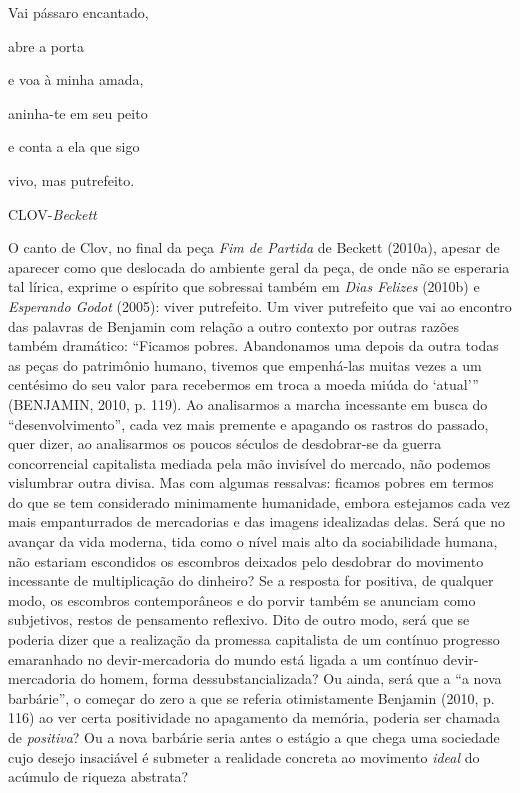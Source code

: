 \begin{flushright}
Vai pássaro encantado,

abre a porta

e voa à minha amada,

aninha-te em seu peito

e conta a ela que sigo

vivo, mas putrefeito.

CLOV-\emph{Beckett}
\end{flushright}

O canto de Clov, no final da peça \emph{Fim de Partida} de Beckett
(2010a), apesar de aparecer como que deslocada do ambiente geral da
peça, de onde não se esperaria tal lírica, exprime o espírito que
sobressai também em \emph{Dias Felizes} (2010b) e \emph{Esperando Godot}
(2005): viver putrefeito. Um viver putrefeito que vai ao encontro das
palavras de Benjamin com relação a outro contexto por outras razões
também dramático: ``Ficamos pobres. Abandonamos uma depois da outra
todas as peças do patrimônio humano, tivemos que empenhá-las muitas
vezes a um centésimo do seu valor para recebermos em troca a moeda miúda
do `atual''' (BENJAMIN, 2010, p. 119). Ao analisarmos a marcha
incessante em busca do ``desenvolvimento'', cada vez mais premente e
apagando os rastros do passado, quer dizer, ao analisarmos os poucos
séculos de desdobrar-se da guerra concorrencial capitalista mediada pela
mão invisível do mercado, não podemos vislumbrar outra divisa. Mas com
algumas ressalvas: ficamos pobres em termos do que se tem considerado
minimamente humanidade, embora estejamos cada vez mais empanturrados de
mercadorias e das imagens idealizadas delas. Será que no avançar da vida
moderna, tida como o nível mais alto da sociabilidade humana, não
estariam escondidos os escombros deixados pelo desdobrar do movimento
incessante de multiplicação do dinheiro? Se a resposta for positiva, de
qualquer modo, os escombros contemporâneos e do porvir também se
anunciam como subjetivos, restos de pensamento reflexivo. Dito de outro
modo, será que se poderia dizer que a realização da promessa capitalista
de um contínuo progresso emaranhado no devir-mercadoria do mundo está
ligada a um contínuo devir-mercadoria do homem, forma
dessubstancializada? Ou ainda, será que a ``a nova barbárie'', o começar
do zero a que se referia otimistamente Benjamin (2010, p. 116) ao ver
certa positividade no apagamento da memória, poderia ser chamada de
\emph{positiva}? Ou a nova barbárie seria antes o estágio a que chega
uma sociedade cujo desejo insaciável é submeter a realidade concreta ao
movimento \emph{ideal} do acúmulo de riqueza abstrata?

